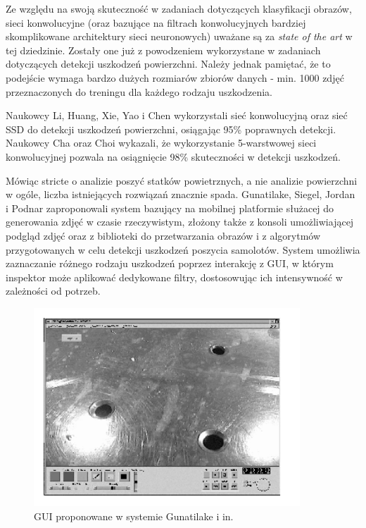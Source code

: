 \documentclass[polish,12pt]{aghthesis}
\begin{document}
\par
Ze względu na swoją skuteczność w zadaniach dotyczących klasyfikacji obrazów, sieci konwolucyjne (oraz bazujące na filtrach konwolucyjnych bardziej skomplikowane architektury sieci neuronowych) uważane są za \textit{state of the art} w tej dziedzinie. Zostały one już z powodzeniem wykorzystane w zadaniach dotyczących detekcji uszkodzeń powierzchni. Należy jednak pamiętać, że to podejście wymaga bardzo dużych rozmiarów zbiorów danych - min. 1000 zdjęć przeznaczonych do treningu dla każdego rodzaju uszkodzenia.
\par
Naukowcy Li, Huang, Xie, Yao i Chen wykorzystali sieć konwolucyjną oraz sieć SSD do detekcji uszkodzeń powierzchni, osiągając 95\% poprawnych detekcji\cite{artLi}. Naukowcy Cha oraz Choi wykazali, że wykorzystanie 5-warstwowej sieci konwolucyjnej pozwala na osiągnięcie 98\% skuteczności w detekcji uszkodzeń\cite{artCha1}.
\par
Mówiąc stricte o analizie poszyć statków powietrznych, a nie analizie powierzchni w ogóle, liczba istniejących rozwiązań znacznie spada. Gunatilake, Siegel, Jordan i Podnar zaproponowali system bazujący na mobilnej platformie służacej do generowania zdjęć w czasie rzeczywistym, złożony także z konsoli umożliwiającej podgląd zdjęć oraz z biblioteki do przetwarzania obrazów i z algorytmów przygotowanych w celu detekcji uszkodzeń poszycia samolotów\cite{artSiegel}. System umożliwia zaznaczanie różnego rodzaju uszkodzeń poprzez interakcję z GUI, w którym inspektor może aplikować dedykowane filtry, dostosowując ich intensywność w zależności od potrzeb.
\begin{figure}[ht]
    \centering
    \includegraphics[width=10cm]{images/console.png}
    \caption{GUI proponowane w systemie Gunatilake i in.\cite{artSiegel}}
    \label{fig:IIW-console}
\end{figure}
\end{document}
